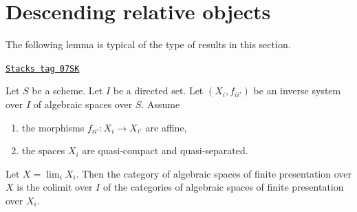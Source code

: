 \section{Descending relative objects}
\label{spaces-limits-section-descending-relative}
The following lemma is typical of the type of results in this section.

\begin{lemma}
\label{spaces-limits-lemma-descend-finite-presentation}
\href{https://stacks.math.columbia.edu/tag/07SK}{\texttt{Stacks tag 07SK}}

Let $S$ be a scheme. Let $I$ be a directed set.
Let $(X_i, f_{ii'})$ be an inverse system over $I$ of algebraic spaces
over $S$. Assume
\begin{enumerate}
\item the morphisms $f_{ii'} : X_i \to X_{i'}$ are affine,
\item the spaces $X_i$ are quasi-compact and quasi-separated.
\end{enumerate}
Let $X = \lim_i X_i$. Then the category of algebraic spaces
of finite presentation over $X$ is the colimit over $I$ of the
categories of algebraic spaces of finite presentation over $X_i$.
\end{lemma}

